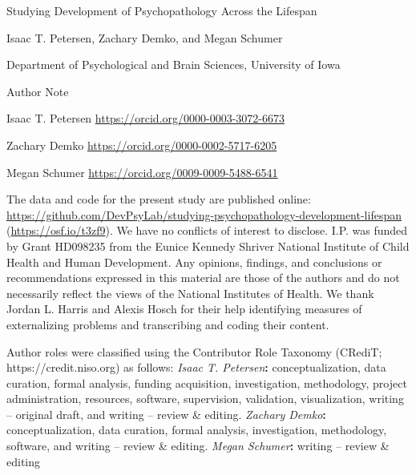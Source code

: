 \documentclass[
  american,
  letterpaper,
  12pt]{article}
\author{Isaac T. Petersen \and Zachary Demko \and Megan Schumer}
\date{}
\newcommand{\apatitle}[1]{%
  {\centering\bfseries #1\par}}
\newcommand{\apatitlepageheading}[1]{%
  {\centering\bfseries #1\par}}
\begin{document}
\hfill\break

\hfill\break

\vspace*{3\baselineskip}

\apatitle{

Studying Development of Psychopathology Across the Lifespan

}

\hfill\break

Isaac T. Petersen, Zachary Demko, and Megan Schumer

Department of Psychological and Brain Sciences, University of Iowa

\hfill\break

\hfill\break

\apatitlepageheading{

Author Note

}

Isaac T. Petersen 
\url{https://orcid.org/0000-0003-3072-6673}

Zachary Demko 
\url{https://orcid.org/0000-0002-5717-6205}

Megan Schumer 
\url{https://orcid.org/0009-0009-5488-6541}

The data and code for the present study are published online:
\url{https://github.com/DevPsyLab/studying-psychopathology-development-lifespan}
(\url{https://osf.io/t3zf9}). We have no conflicts of interest to
disclose. I.P. was funded by Grant HD098235 from the Eunice Kennedy
Shriver National Institute of Child Health and Human Development. Any
opinions, findings, and conclusions or recommendations expressed in this
material are those of the authors and do not necessarily reflect the
views of the National Institutes of Health. We thank Jordan L. Harris
and Alexis Hosch for their help identifying measures of externalizing
problems and transcribing and coding their content.

Author roles were classified using the Contributor Role Taxonomy
(CRediT; https://credit.niso.org) as follows: \emph{Isaac T.
Petersen}\textbf{: }conceptualization, data curation, formal analysis, funding acquisition, investigation, methodology, project administration, resources, software, supervision, validation, visualization, writing -- original draft, and writing -- review \& editing. \emph{Zachary
Demko}\textbf{: }conceptualization, data curation, formal analysis, investigation, methodology, software, and writing -- review \& editing. \emph{Megan
Schumer}\textbf{: }writing -- review \& editing
\end{document}
